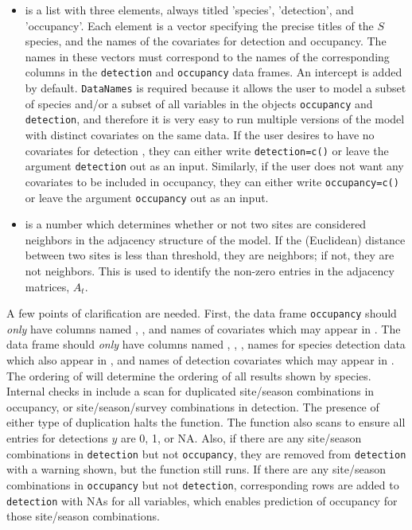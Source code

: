 \begin{itemize}
\item {} is a list with three elements, always titled 'species', 'detection', and 'occupancy'.  Each element is a vector specifying the precise titles of the $S$ species, and the names of the covariates for detection and occupancy. The names in these vectors must correspond to the names of the corresponding columns in the \texttt{detection} and \texttt{occupancy} data frames.  An intercept is added by default.  \texttt{DataNames} is required because it allows the user to model a subset of species and/or a subset of all variables in the objects \texttt{occupancy} and \texttt{detection}, and therefore it is very easy to run multiple versions of the model with distinct covariates on the same data.  If the user desires to have no covariates for detection , they can either write \texttt{detection=c()} or leave the argument \texttt{detection} out as an input. Similarly, if the user does not want any covariates to be included in occupancy, they can either write \texttt{occupancy=c()} or leave the argument \texttt{occupancy} out as an input.
    
\item {} is a number which determines whether or not two sites are considered neighbors in the adjacency structure of the model.  If the (Euclidean) distance between two sites is less than threshold, they are neighbors; if not, they are not neighbors. This is used to identify the non-zero entries in the adjacency matrices, $A_t$. 
\end{itemize}


A few points of clarification are needed.  First, the data frame \texttt{occupancy} should \textit{only} have columns named , , and names of covariates which may appear in .  The data frame  should \textit{only} have columns named , , , names for species detection data which also appear in , and names of detection covariates which may appear in .  The ordering of  will determine the ordering of all results shown by species.  Internal checks in  include a scan for duplicated site/season combinations in occupancy, or site/season/survey combinations in detection.  The presence of either type of duplication halts the function.  The function also scans to ensure all entries for detections $y$ are 0, 1, or NA.  Also, if there are any site/season combinations in \texttt{detection} but not \texttt{occupancy}, they are removed from \texttt{detection} with a warning shown, but the function still runs.  If there are any site/season combinations in \texttt{occupancy} but not \texttt{detection}, corresponding rows are added to \texttt{detection} with NAs for all variables, which enables prediction of occupancy for those site/season combinations. 

